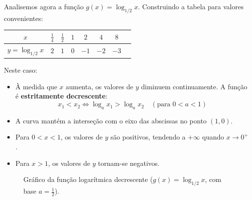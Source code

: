 \documentclass[12pt,a4paper]{report}
\begin{document}
	Analisemos agora a função $g(x) = \log_{1/2} x$. Construindo a tabela para valores convenientes:
	
	\begin{center}
		\begin{tabular}{|c|c|c|c|c|c|c|c|}
			\hline
			$x$ & $\frac{1}{4}$ & $\frac{1}{2}$ & $1$ & $2$ & $4$ & $8$ \\
			\hline
			$y = \log_{1/2} x$ & $2$ & $1$ & $0$ & $-1$ & $-2$ & $-3$ \\
			\hline
		\end{tabular}
	\end{center}
	
	Neste caso:
	\begin{itemize}[label=$\circ$]
		\item À medida que $x$ aumenta, os valores de $y$ diminuem continuamente. A função é \textbf{estritamente decrescente}:
		$$x_1 < x_2 \iff \log_a x_1 > \log_a x_2 \quad (\text{para } 0 < a < 1)$$
		\item A curva mantém a interseção com o eixo das abscissas no ponto $(1, 0)$.
		\item Para $0 < x < 1$, os valores de $y$ são positivos, tendendo a $+\infty$ quando $x \to 0^+$.
		\item Para $x > 1$, os valores de $y$ tornam-se negativos.
	\end{itemize}
	
	\begin{figure}[htbp]
		\centering
		\caption{Gráfico da função logarítmica decrescente ($g(x) = \log_{1/2} x$, com base $a = \frac{1}{2}$).}
		\label{fig:log_decrescente}
	\end{figure}
	
\end{document}
